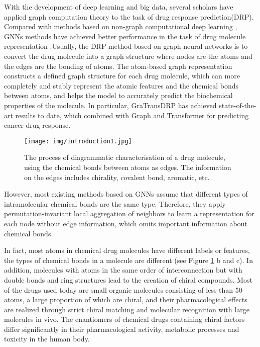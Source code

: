 \documentclass{article}
\begin{document}
With the development of deep learning and big data, several scholars have applied graph computation theory to the task of drug response prediction(DRP). Compared with methods based on non-graph computational deep learning \cite{tcnns,MOLI,CDRscan}, GNNs methods have achieved better performance in the task of drug molecule representation \cite{DeepCDR,18bMultipleOmic,GraphDTA,110bGCNforDRP,GraTransDRP}.Usually, the DRP method based on graph neural networks is to convert the drug molecule into a graph structure  where nodes are the atoms and the edges are the bonding of atoms. The atom-based graph representation constructs a defined graph structure for each drug molecule, which can more completely and stably represent the atomic features and the chemical bonds between atoms, and helps the model to accurately predict the biochemical properties of the molecule.
In particular, GraTransDRP \cite{GraTransDRP} has achieved state-of-the-art results to date, which combined with Graph and Transformer for predicting cancer drug response.





















\begin{figure}[htpb]
    \centering
    \texttt{[image: img/introduction1.jpg]}
    \caption{The process of diagrammatic characterisation of a drug molecule, using the chemical bonds between atoms as edges. The information on the edges includes chirality, covalent bond, aromatic, etc.}
   	\label{fig:intro1}
\end{figure}







	






However, most existing methods based on GNNs assume that different types of intramolecular chemical bonds are the same type. Therefore, they apply permutation-invariant local aggregation of neighbors to learn a representation for each node without edge information, which omits important information about chemical bonds.

In fact, most atoms in chemical drug molecules have different labels or features, the types of chemical bonds in a molecule are different  (see Figure \ref{fig:intro1} b and c). In addition, molecules with atoms in the same order of interconnection but with double bonds and ring structures lead to the creation of chiral compounds. Most of the drugs used today are small organic molecules consisting of less than 50 atoms, a large proportion of which are chiral, and their pharmacological effects are realized through strict chiral matching and molecular recognition with large molecules in vivo. The enantiomers of chemical drugs containing chiral factors differ significantly in their pharmacological activity, metabolic processes and toxicity in the human body. 
\end{document}
